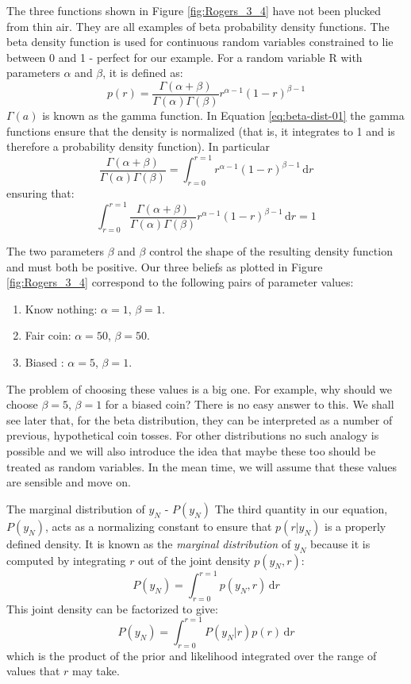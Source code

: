 The three functions shown in Figure \ref{fig:Rogers_3_4} have not been plucked from thin air.
They are all examples of beta probability density functions. The
beta density function is used for continuous random variables constrained to lie
between 0 and 1 - perfect for our example. For a random variable R with parameters
$\alpha$ and $\beta$, it is defined as:
\begin{equation}
p(r) = \frac{\Gamma(\alpha + \beta)}{\Gamma(\alpha)\Gamma(\beta)}
r^{\alpha - 1} (1 - r)^{\beta - 1}
\label{eq:beta-dist-01}
\end{equation}
$\Gamma(a)$ is known as the gamma function.
In Equation \eqref{eq:beta-dist-01} the gamma
functions ensure that the density is normalized (that is, it integrates to 1 and is
therefore a probability density function). In particular
\begin{equation*}
\frac{\Gamma(\alpha + \beta)}{\Gamma(\alpha)\Gamma(\beta)} =
\int_{r=0}^{r=1} r^{\alpha - 1} (1 - r)^{\beta - 1}\, \mathrm{d}r
\end{equation*}
ensuring that:
\begin{equation*}
\int_{r=0}^{r=1}
\frac{\Gamma(\alpha + \beta)}{\Gamma(\alpha)\Gamma(\beta)}
r^{\alpha - 1} (1 - r)^{\beta - 1}\, \mathrm{d}r = 1
\end{equation*}

The two parameters $\beta$ and $\beta$ control the shape of the
resulting density function
and must both be positive. Our three beliefs as plotted in Figure \ref{fig:Rogers_3_4}
correspond to
the following pairs of parameter values:
\begin{enumerate}
\item Know nothing: $\alpha = 1$, $\beta = 1$.
\item Fair coin: $\alpha = 50$, $\beta = 50$.
\item Biased : $\alpha = 5$, $\beta = 1$.
\end{enumerate}
The problem of choosing these values is a big one. For example, why should we
choose $\beta = 5$, $\beta = 1$ for a biased coin?
There is no easy answer to this. We shall see
later that, for the beta distribution, they can be interpreted as a number of previous,
hypothetical coin tosses. For other distributions no such analogy is possible and
we will also introduce the idea that maybe these too should be treated as random
variables. In the mean time, we will assume that these values are sensible and move on.


The marginal distribution of $y_N$ - $P(y_N)$ The third quantity in our equation,
$P(y_N)$, acts as a normalizing constant to ensure that $p(r|y_N)$ is a properly
defined density. It is known as the \emph{marginal distribution} of $y_N$ because it is
computed by integrating $r$ out of the joint density $p(y_N,r)$:
\begin{equation*}
P(y_N) = \int_{r=0}^{r=1} p(y_N,r) \, \mathrm{d}r
\end{equation*}
This joint density can be factorized to give:
\begin{equation*}
P(y_N) = \int_{r=0}^{r=1} P(y_N|r) p(r) \, \mathrm{d}r
\end{equation*}
which is the product of the prior and likelihood integrated over the range of values
that $r$ may take.

